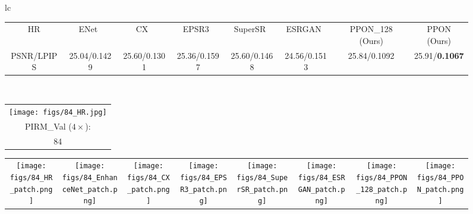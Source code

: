 \documentclass[preprint]{elsarticle}
\begin{document}
\begin{figure*}[htpb]
{\begin{tabular}{lc}
\begin{adjustbox}{valign=t}
\begin{tabular}{cccccccc}
					HR & \hspace{-3mm} ENet~\cite{EnhanceNet} & \hspace{-3mm} CX~\cite{CX} & \hspace{-3mm} EPSR3~\cite{EPSR} & 
					SuperSR~\cite{ESRGAN} & \hspace{-3mm} ESRGAN~\cite{ESRGAN} & \hspace{-3mm} PPON\_128 (Ours) & \hspace{-3mm} PPON (Ours) \\
					
					PSNR/LPIPS & \hspace{-3mm} 25.04/0.1429 & \hspace{-3mm} 25.60/0.1301 & \hspace{-3mm} 25.36/0.1597 &
					25.60/0.1468 & \hspace{-3mm} 24.56/0.1513 & \hspace{-3mm} 25.84/0.1092 & \hspace{-3mm} 25.91/\textbf{0.1067} \\
				\end{tabular}
			\end{adjustbox}
			\\
			\begin{adjustbox}{valign=t}
				\scriptsize
				\begin{tabular}{c}
					\texttt{[image: figs/84\_HR.jpg]} \\
					PIRM\_Val ($4 \times$): \\
					84 \\
				\end{tabular}
			\end{adjustbox}
			\hspace{-3mm}
			\begin{adjustbox}{valign=t}
				\scriptsize
				\begin{tabular}{cccccccc}
					\texttt{[image: figs/84\_HR\_patch.png]} &
					\hspace{-3mm}
					\texttt{[image: figs/84\_EnhanceNet\_patch.png]} &
					\hspace{-3mm}
					\texttt{[image: figs/84\_CX\_patch.png]} &
					\hspace{-3mm}
					\texttt{[image: figs/84\_EPSR3\_patch.png]} &
					\hspace{-3mm}					
					\texttt{[image: figs/84\_SuperSR\_patch.png]} &
					\hspace{-3mm}
					\texttt{[image: figs/84\_ESRGAN\_patch.png]} &
					\hspace{-3mm}
					\texttt{[image: figs/84\_PPON\_128\_patch.png]} &
					\hspace{-3mm}
					\texttt{[image: figs/84\_PPON\_patch.png]} \\
					

\end{tabular}
\end{adjustbox}
\end{tabular}}
\end{figure*}
\end{document}
